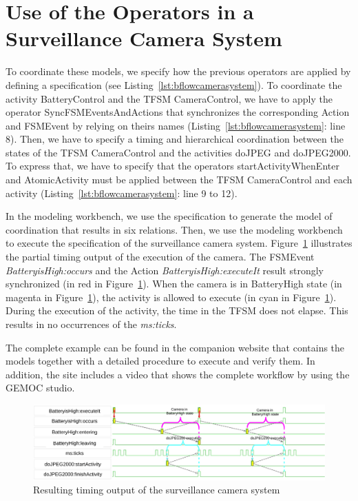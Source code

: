 \section{Use of the Operators in a Surveillance Camera System}


To coordinate these models, we specify how the previous operators are applied by defining a \bflow specification (see Listing~\ref{lst:bflowcamerasystem}). To coordinate the activity BatteryControl and the TFSM CameraControl, we have to apply the operator SyncFSMEventsAndActions that synchronizes the corresponding Action and FSMEvent by relying on theirs names (Listing~\ref{lst:bflowcamerasystem}: line 8). Then, we have to specify a timing and hierarchical coordination between the states of the TFSM CameraControl and the activities doJPEG and doJPEG2000. To express that, we have to specify that the operators startActivityWhenEnter and AtomicActivity must be applied between the TFSM CameraControl and each activity (Listing~\ref{lst:bflowcamerasystem}: line 9 to 12).

In the modeling workbench, we use the \bflow specification to generate the model of coordination that results in six \ccsl relations. Then, we use the modeling workbench to execute the \ccsl specification of the surveillance camera system. Figure~\ref{fig:camerasystem} illustrates the partial timing output of the execution of the camera. The \mse FSMEvent \emph{BatteryisHigh:occurs} and the Action \emph{BatteryisHigh:executeIt} result strongly synchronized (in red in Figure~\ref{fig:camerasystem}). When the camera is in BatteryHigh state (in magenta in Figure~\ref{fig:camerasystem}), the activity is allowed to execute (in cyan in Figure~\ref{fig:camerasystem}). During the execution of the activity, the time in the TFSM does not elapse. This results in no occurrences of the \mse \emph{ms:ticks}.
	
The complete example can be found in the companion website that contains the models together with a detailed procedure to execute and verify them. In addition, the site includes a video that shows the complete workflow by using the GEMOC studio. 
		\begin{figure}
			\center
			\includegraphics[width=1\columnwidth]{examples/figs/vcdcamera}
			\caption{Resulting timing output of the surveillance camera system}
			\label{fig:camerasystem}
		\end{figure}
	
